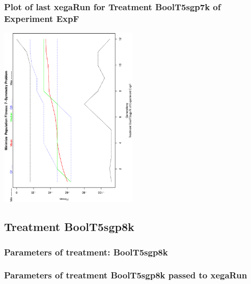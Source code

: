 \documentclass[18pt,c]{beamer}
\begin{document}
 \begin{frame}
 \frametitle{ Plot of last xegaRun for Treatment BoolT5sgp7k of Experiment ExpF }
 \begin{center}
\includegraphics[width=0.5\textwidth, angle=-90]
{ExpFPlotPopStatsFigure008.eps}
 \end{center}
 \label{report/ExpFPlotPopStatsFigure008.eps}  
 \end{frame}

\clearpage
\subsection{Treatment BoolT5sgp8k}

 \begin{frame}
 \fontsize{8pt}{9pt}\selectfont
 \frametitle{  Parameters of treatment: BoolT5sgp8k 
 }

 \label{ExpFtParmTable036.tex}  
 \end{frame}


 \begin{frame}
 \fontsize{8pt}{9pt}\selectfont
 \frametitle{  Parameters of treatment BoolT5sgp8k passed to xegaRun
 }

 \label{ExpFtParmTable037.tex}  
 \end{frame}
\end{document}
